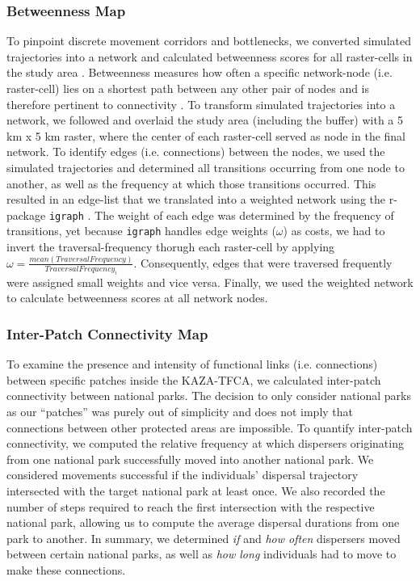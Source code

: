 \documentclass[abstract=on,10pt,a4paper,bibliography=totocnumbered]{article}
\begin{document}
\subsubsection{Betweenness Map}
To pinpoint discrete movement corridors and bottlenecks, we converted simulated
trajectories into a network and calculated betweenness scores for all
raster-cells in the study area \citep{BastilleRousseau.2018}. Betweenness
measures how often a specific network-node (i.e. raster-cell) lies on a shortest
path between any other pair of nodes and is therefore pertinent to connectivity
\citep{BastilleRousseau.2018}. To transform simulated trajectories into a
network, we followed \citep{BastilleRousseau.2018} and overlaid the study area
(including the buffer) with a 5 km x 5 km raster, where the center of each
raster-cell served as node in the final network. To identify edges (i.e.
connections) between the nodes, we used the simulated trajectories and
determined all transitions occurring from one node to another, as well as the
frequency at which those transitions occurred. This resulted in an edge-list
that we translated into a weighted network using the r-package {\tt igraph}
\citep{Gabor.2006}. The weight of each edge was determined by the frequency of
transitions, yet because {\tt igraph} handles edge weights (\(\omega\)) as
costs, we had to invert the traversal-frequency thorugh each raster-cell by
applying \(\omega = \frac{mean(Traversal Frequency)}{Traversal Frequency_i}\).
Consequently, edges that were traversed frequently were assigned small weights
and vice versa. Finally, we used the weighted network to calculate betweenness
scores at all network nodes.

\subsubsection{Inter-Patch Connectivity Map}
To examine the presence and intensity of functional links (i.e. connections)
between specific patches inside the KAZA-TFCA, we calculated inter-patch
connectivity between national parks. The decision to only consider national
parks as our  ``patches'' was purely out of simplicity and does not imply that
connections between other protected areas are impossible. To quantify
inter-patch connectivity, we computed the relative frequency at which dispersers
originating from one national park successfully moved into another national
park. We considered movements successful if the individuals' dispersal
trajectory intersected with the target national park at least once. We also
recorded the number of steps required to reach the first intersection with the
respective national park, allowing us to compute the average dispersal durations
from one park to another. In summary, we determined \textit{if} and \textit{how
often} dispersers moved between certain national parks, as well as \textit{how
long} individuals had to move to make these connections.
\end{document}
